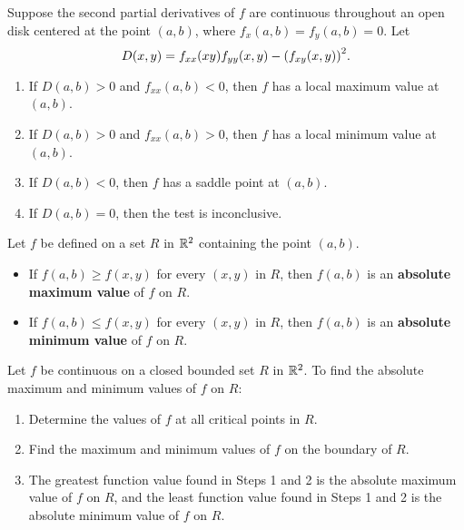 \documentclass[mathNotesPreamble]{subfiles}
\begin{document}
  \begin{thmBox*}
    Suppose the second partial derivatives of $f$ are continuous throughout an open disk centered at the point $(a,b)$, where $f_x(a,b)=f_y(a,b)=0$. Let 
      \[D(x,y)=f_{xx}(xy) f_{yy}(x,y)-{\left(f_{xy}(x,y)\right)}^2.\]
    \begin{enumerate}
      \item 
        If $D(a,b) > 0$ and $f_{xx}(a,b) < 0$, then $f$ has a local maximum value at $(a,b)$.
      \item 
        If $D(a,b) > 0$ and $f_{xx}(a,b) > 0$, then $f$ has a local minimum value at $(a,b)$.
      \item 
        If $D(a,b) <0$, then $f$ has a saddle point at $(a,b)$.
      \item 
        If $D(a,b)=0$, then the test is inconclusive.
    \end{enumerate}
  \end{thmBox*}

  \begin{defn*}
    Let $f$ be defined on a set $R$ in $\mathbb{R}^2$ containing the point $(a,b)$. 
    \begin{itemize}
      \item 
        If $f(a,b)\geq f(x,y)$ for every $(x,y)$ in $R$, then $f(a,b)$ is an \textbf{absolute maximum value} of $f$ on $R$.
      \item 
        If $f(a,b)\leq f(x,y)$ for every $(x,y)$ in $R$, then $f(a,b)$ is an \textbf{absolute minimum value} of $f$ on $R$.
    \end{itemize}
  \end{defn*}

  \begin{thmBox*}
    Let $f$ be continuous on a closed bounded set $R$ in $\mathbb{R}^2$. To find the absolute maximum and minimum values of $f$ on $R$:
    \begin{enumerate}
      \item 
        Determine the values of $f$ at all critical points in $R$.
      \item 
        Find the maximum and minimum values of $f$ on the boundary of $R$.
      \item 
        The greatest function value found in Steps 1 and 2 is the absolute maximum value of $f$ on $R$, and the least function value found in Steps 1 and 2 is the absolute minimum value of $f$ on $R$.
    \end{enumerate}
  \end{thmBox*}

  \pagebreak
  
\end{document}
